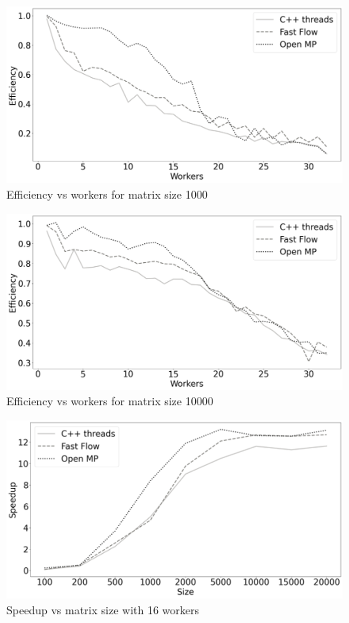 \documentclass[12pt]{article}
\begin{document}
	\begin{figure}[H]
		\centering
		\includegraphics[width=13cm]{./images/efficiency_vs_cores_1000}
		\caption{Efficiency vs workers for matrix size 1000}
	\end{figure}

	\begin{figure}[H]
		\centering
		\includegraphics[width=13cm]{./images/efficiency_vs_cores_10000}
		\caption{Efficiency vs workers for matrix size 10000}
	\end{figure}

	\begin{figure}[H]
		\centering
		\includegraphics[width=13cm]{./images/speedup_vs_size}
		\caption{Speedup vs matrix size with 16 workers}
		\label{fig:speed_vs_size}
	\end{figure}
\end{document}
